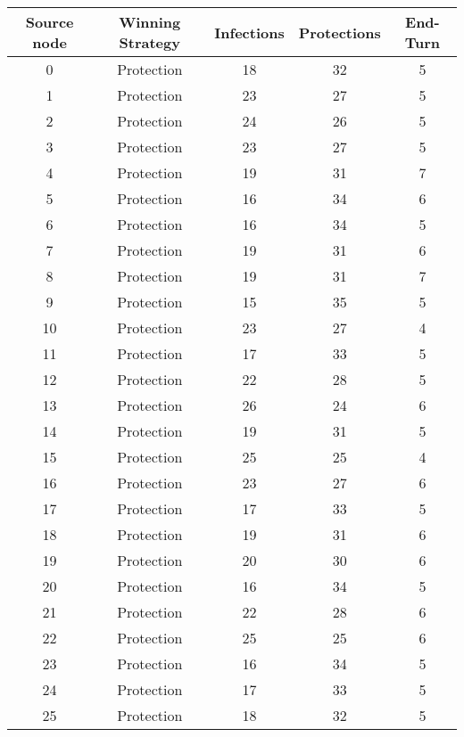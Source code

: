 \documentclass[results.tex]{subfiles}
\begin{document}
\begin{center}
  \begin{tabular}{| c || c | c | c | c |}
    \hline
    {\bfseries Source node} & {\bfseries Winning Strategy} & {\bfseries Infections} & {\bfseries Protections} & {\bfseries End-Turn} \\  %
    \hline\hline
    0 & Protection & 18 & 32 & 5 \\ 
    \hline
    1 & Protection & 23 & 27 & 5 \\ 
    \hline
    2 & Protection & 24 & 26 & 5 \\ 
    \hline
    3 & Protection & 23 & 27 & 5 \\ 
    \hline
    4 & Protection & 19 & 31 & 7 \\ 
    \hline
    5 & Protection & 16 & 34 & 6 \\ 
    \hline
    6 & Protection & 16 & 34 & 5 \\ 
    \hline
    7 & Protection & 19 & 31 & 6 \\ 
    \hline
    8 & Protection & 19 & 31 & 7 \\ 
    \hline
    9 & Protection & 15 & 35 & 5 \\ 
    \hline
    10 & Protection & 23 & 27 & 4 \\ 
    \hline
    11 & Protection & 17 & 33 & 5 \\ 
    \hline
    12 & Protection & 22 & 28 & 5 \\ 
    \hline
    13 & Protection & 26 & 24 & 6 \\ 
    \hline
    14 & Protection & 19 & 31 & 5 \\ 
    \hline
    15 & Protection & 25 & 25 & 4 \\ 
    \hline
    16 & Protection & 23 & 27 & 6 \\ 
    \hline
    17 & Protection & 17 & 33 & 5 \\ 
    \hline
    18 & Protection & 19 & 31 & 6 \\ 
    \hline
    19 & Protection & 20 & 30 & 6 \\ 
    \hline
    20 & Protection & 16 & 34 & 5 \\ 
    \hline
    21 & Protection & 22 & 28 & 6 \\ 
    \hline
    22 & Protection & 25 & 25 & 6 \\ 
    \hline
    23 & Protection & 16 & 34 & 5 \\ 
    \hline
    24 & Protection & 17 & 33 & 5 \\ 
    \hline
    25 & Protection & 18 & 32 & 5 \\ 

\end{tabular}
\end{center}
\end{document}
